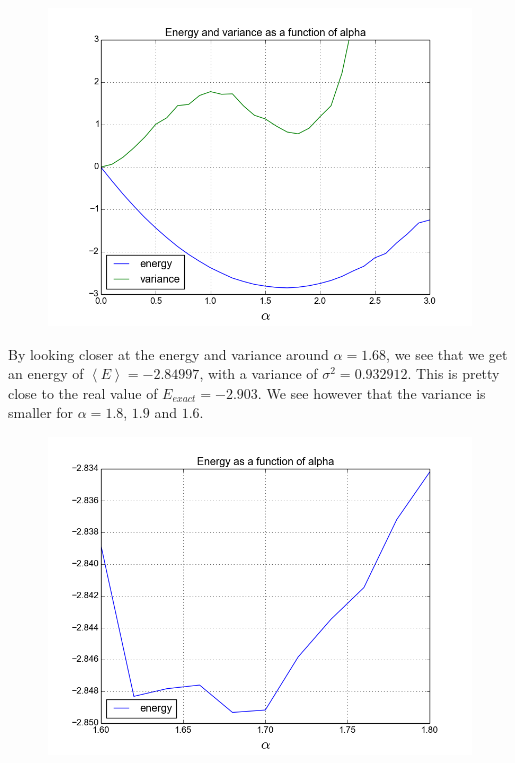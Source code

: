 \documentclass[a4paper, 12pt, titlepage]{article}
\begin{document}
 \begin{figure}[H]
 	\centering
 	\includegraphics[width=\textwidth]{../python_programs/EnergyVariance_helium1.png}
 \end{figure}

 By looking closer at the energy and variance around $\alpha = 1.68$, we see that we get an energy of $\left<E\right> = -2.84997$, with a variance of $\sigma ^2 = 0.932912$. This is pretty close to the real value of $E_{exact} = -2.903$. We see however that the variance is smaller for $\alpha = 1.8$, $1.9$ and $1.6$.
 
 \begin{figure}[H]
 	\centering
 	\includegraphics[width=\textwidth]{../python_programs/EnergyVariance_helium2.png}
 \end{figure}
\end{document}
